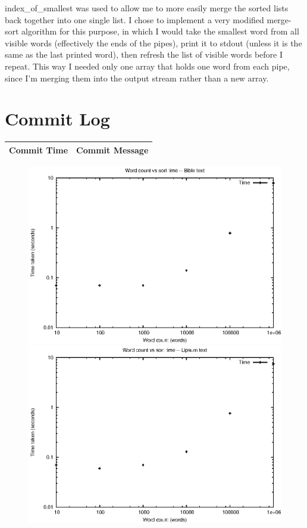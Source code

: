\documentclass[letterpaper,10pt,twocolumn,titlepage]{article}
\begin{document}
index\_of\_smallest was used to allow me to more easily merge
the sorted lists back together into one single list. I chose to
implement a very modified merge-sort algorithm for this purpose,
in which I would take the smallest word from all visible words 
(effectively the ends of the pipes), print it to stdout (unless it
is the same as the last printed word), then refresh the list of 
visible words before I repeat. This way I needed only one array that
holds one word from each pipe, since I'm merging them into the output
stream rather than a new array.

\section{Commit Log}

\begin{tabular}{ | p{3cm} | p{5.5cm} | }
	\hline
	Commit Time & Commit Message \\ \hline
	
\end{tabular}

\vfill\break

\fancyhead{}

\begin{figure}[h]
\includegraphics{bible_log.eps}
\includegraphics{lipsum_log.eps}  
\end{figure}
\end{document}
